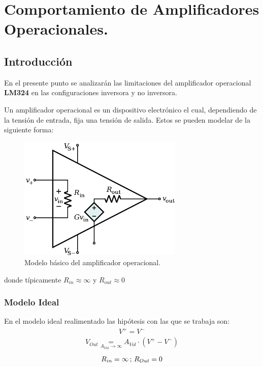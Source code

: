 

\newcommand\underrel[2]{\mathrel{\mathop{#2}\limits_{#1}}}

\usepackage{circuitikz}
\usepackage{xcolor}
\usepackage{amsmath}




\section{Comportamiento de Amplificadores Operacionales.}

\subsection{Introducción}
En el presente punto se analizarán las limitaciones del amplificador operacional  \textbf{LM324} en las configuraciones inversora y no inversora.

Un amplificador operacional es un dispositivo electrónico el cual, dependiendo de la tensión de entrada, fija una tensión de salida. Estos se pueden modelar de la siguiente forma:
\begin{figure}[H]	
	\centering
	\includegraphics[width=0.7\textwidth]{Ejercicio1/Imagenes/Basicopamp.png}
	\caption{Modelo básico del amplificador operacional.}
	\label{fig:Basicopamp}
\end{figure}
donde típicamente $R_{in}\approx \infty$ y $R_{out} \approx 0$

\subsubsection{Modelo Ideal}
En el modelo ideal realimentado las hipótesis con las que se trabaja son:
\begin{align} V^+ = V^- \end{align}
\begin{align}V_{Out} \underrel{A_{Vol}\to \infty}{=} A_{Vol} \cdot (V^+ - V^-) \end{align}
\begin{align} R_{in}=\infty   \thinspace;\thinspace R_{Out} = 0 \end{align}

